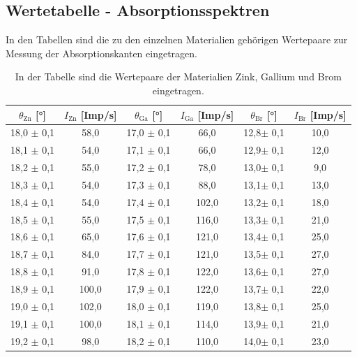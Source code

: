 \documentclass[titlepage = firstcover]{scrartcl}
\begin{document}
            \subsection{Wertetabelle - Absorptionsspektren}
            In den Tabellen sind die zu den einzelnen Materialien gehörigen Wertepaare zur Messung der Absorptionskanten eingetragen.
            \FloatBarrier
            \begin{table}
              \centering
              \caption{In der Tabelle sind die Wertepaare der Materialien Zink, Gallium und Brom eingetragen.}

              \begin{tabular} {c c c c c c}
                \toprule
                {$\theta_{\text{Zn}}$ [°]} & {$I_{\text{Zn}}$ [Imp/s]} & {$\theta_{\text{Ga}}$ [°]} & {$I_{\text{Ga}}$ [Imp/s]} & {$\theta_{\text{Br}}$ [°]} & {$I_{\text{Br}}$ [Imp/s]} \\
                \midrule
                18,0 $\pm$ 0,1	& 58,0   & 17,0 $\pm$ 0,1  & 66,0   & 12,8$\pm$ 0,1 & 10,0 \\
                18,1 $\pm$ 0,1	& 54,0   & 17,1 $\pm$ 0,1  & 66,0   & 12,9$\pm$ 0,1 & 12,0 \\
                18,2 $\pm$ 0,1	& 55,0   & 17,2 $\pm$ 0,1  & 78,0   & 13,0$\pm$ 0,1 & 9,0  \\
                18,3 $\pm$ 0,1	& 54,0   & 17,3 $\pm$ 0,1  & 88,0   & 13,1$\pm$ 0,1 & 13,0 \\
                18,4 $\pm$ 0,1	& 54,0   & 17,4 $\pm$ 0,1  & 102,0  & 13,2$\pm$ 0,1 & 18,0 \\
                18,5 $\pm$ 0,1	& 55,0   & 17,5 $\pm$ 0,1  & 116,0  & 13,3$\pm$ 0,1 & 21,0 \\
                18,6 $\pm$ 0,1	& 65,0   & 17,6 $\pm$ 0,1  & 121,0  & 13,4$\pm$ 0,1 & 25,0 \\
                18,7 $\pm$ 0,1	& 84,0   & 17,7 $\pm$ 0,1  & 121,0  & 13,5$\pm$ 0,1 & 27,0 \\
                18,8 $\pm$ 0,1	& 91,0   & 17,8 $\pm$ 0,1  & 122,0  & 13,6$\pm$ 0,1 & 27,0 \\
                18,9 $\pm$ 0,1	& 100,0  & 17,9 $\pm$ 0,1  & 122,0  & 13,7$\pm$ 0,1 & 22,0 \\
                19,0 $\pm$ 0,1	& 102,0  & 18,0 $\pm$ 0,1  & 119,0  & 13,8$\pm$ 0,1 & 25,0 \\
                19,1 $\pm$ 0,1	& 100,0  & 18,1 $\pm$ 0,1  & 114,0  & 13,9$\pm$ 0,1 & 21,0 \\
                19,2 $\pm$ 0,1	& 98,0   & 18,2 $\pm$ 0,1  & 110,0  & 14,0$\pm$ 0,1 & 23,0 \\

\end{tabular}
\end{table}
\end{document}
